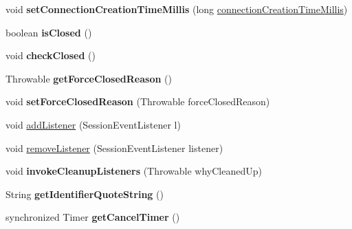 \begin{DoxyCompactItemize}
void {\bfseries set\+Connection\+Creation\+Time\+Millis} (long \mbox{\hyperlink{classcom_1_1mysql_1_1cj_1_1_core_session_afe99c9d8a829f985f424087e61f4cad6}{connection\+Creation\+Time\+Millis}})
\item 
\mbox{\label{classcom_1_1mysql_1_1cj_1_1_native_session_a41c503c26623fb7da3cd6a8e854247f8}} 
boolean {\bfseries is\+Closed} ()
\item 
\mbox{\label{classcom_1_1mysql_1_1cj_1_1_native_session_a7b560452deaadf256bcefc6ee497f006}} 
void {\bfseries check\+Closed} ()
\item 
\mbox{\label{classcom_1_1mysql_1_1cj_1_1_native_session_ac3798e124e39f98030b01c3201e2d281}} 
Throwable {\bfseries get\+Force\+Closed\+Reason} ()
\item 
\mbox{\label{classcom_1_1mysql_1_1cj_1_1_native_session_a8c13be2c7c755a6e054c1779d0f9aea9}} 
void {\bfseries set\+Force\+Closed\+Reason} (Throwable force\+Closed\+Reason)
\item 
void \mbox{\hyperlink{classcom_1_1mysql_1_1cj_1_1_native_session_af9c9459689e10e1f44ef81395080bc36}{add\+Listener}} (Session\+Event\+Listener l)
\item 
void \mbox{\hyperlink{classcom_1_1mysql_1_1cj_1_1_native_session_a757e9719da6f9e70c29c990ce7e0267a}{remove\+Listener}} (Session\+Event\+Listener listener)
\item 
\mbox{\label{classcom_1_1mysql_1_1cj_1_1_native_session_a78a3b77cb0addf3900c509222a527c42}} 
void {\bfseries invoke\+Cleanup\+Listeners} (Throwable why\+Cleaned\+Up)
\item 
\mbox{\label{classcom_1_1mysql_1_1cj_1_1_native_session_af85c1c114ea3ef2ab2d588cd178512cf}} 
String {\bfseries get\+Identifier\+Quote\+String} ()
\item 
\mbox{\label{classcom_1_1mysql_1_1cj_1_1_native_session_a21f772a2e61b6ec36e136b894ea22d95}} 
synchronized Timer {\bfseries get\+Cancel\+Timer} ()
\end{DoxyCompactItemize}
